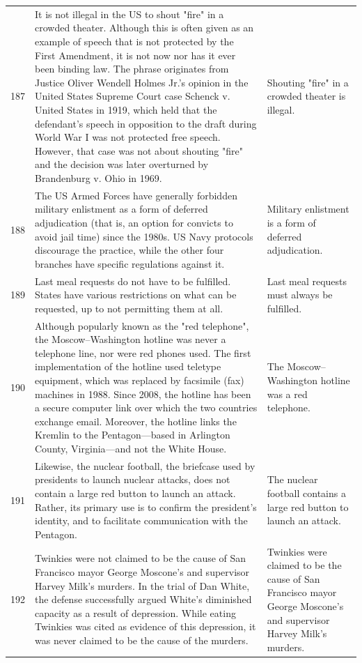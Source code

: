 \begin{tabular}{c|p{}|p{}}
187 & It is not illegal in the US to shout "fire" in a crowded theater. Although this is often given as an example of speech that is not protected by the First Amendment, it is not now nor has it ever been binding law. The phrase originates from Justice Oliver Wendell Holmes Jr.'s opinion in the United States Supreme Court case Schenck v. United States in 1919, which held that the defendant's speech in opposition to the draft during World War I was not protected free speech. However, that case was not about shouting "fire" and the decision was later overturned by Brandenburg v. Ohio in 1969. & Shouting "fire" in a crowded theater is illegal. \\
188 & The US Armed Forces have generally forbidden military enlistment as a form of deferred adjudication (that is, an option for convicts to avoid jail time) since the 1980s. US Navy protocols discourage the practice, while the other four branches have specific regulations against it. & Military enlistment is a form of deferred adjudication. \\
189 & Last meal requests do not have to be fulfilled. States have various restrictions on what can be requested, up to not permitting them at all. & Last meal requests must always be fulfilled. \\
190 & Although popularly known as the "red telephone", the Moscow–Washington hotline was never a telephone line, nor were red phones used. The first implementation of the hotline used teletype equipment, which was replaced by facsimile (fax) machines in 1988. Since 2008, the hotline has been a secure computer link over which the two countries exchange email. Moreover, the hotline links the Kremlin to the Pentagon—based in Arlington County, Virginia—and not the White House. & The Moscow–Washington hotline was a red telephone. \\
191 & Likewise, the nuclear football, the briefcase used by presidents to launch nuclear attacks, does not contain a large red button to launch an attack. Rather, its primary use is to confirm the president's identity, and to facilitate communication with the Pentagon. & The nuclear football contains a large red button to launch an attack. \\
192 & Twinkies were not claimed to be the cause of San Francisco mayor George Moscone's and supervisor Harvey Milk's murders. In the trial of Dan White, the defense successfully argued White's diminished capacity as a result of depression. While eating Twinkies was cited as evidence of this depression, it was never claimed to be the cause of the murders. & Twinkies were claimed to be the cause of San Francisco mayor George Moscone's and supervisor Harvey Milk's murders. \\

\end{tabular}
